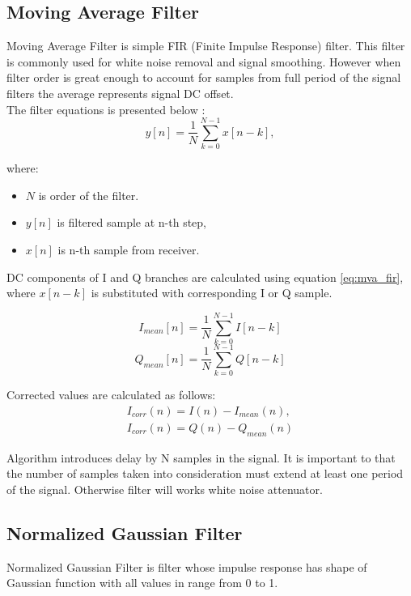 \documentclass[en,printmode]{mgr}
\begin{document}
		\subsection*{Moving Average Filter}
			Moving Average Filter is simple FIR (Finite Impulse Response) filter. This filter is
			commonly used for white noise removal and signal smoothing. However when filter order
			is great enough to account for samples from full period of the signal filters the
			average represents signal DC offset.
			\\
			
			
			The filter equations is presented below \cite{mav}:
			\begin{equation}
				y[n] = \frac{1}{N} \sum_{k=0}^{N-1}x[n-k], \label{eq:mva_fir} 
			\end{equation}
			
			where:
			\begin{itemize}
				\item   $N$ is order of the filter.
				\item	$y[n]$ is filtered sample at n-th step,
				\item   $x[n]$ is n-th sample from receiver.
			\end{itemize}			
			
			DC components of I and Q branches are calculated using equation \ref{eq:mva_fir},
			where $x[n-k]$ is substituted with corresponding I or Q sample.

			\[
				I_{mean}[n] = \frac{1}{N} \sum_{k=0}^{N-1}I[n-k]
			\]
			\[
				Q_{mean}[n] = \frac{1}{N} \sum_{k=0}^{N-1}Q[n-k]
			\]
			
			Corrected values are calculated as follows:
			\[
			\renewcommand*{\arraystretch}{1.3} 
			\begin{array}{ll}
				I_{corr}(n) = I(n) - I_{mean}(n), \\
				I_{corr}(n) = Q(n) - Q_{mean}(n)
			\end{array}
			\]
			
			Algorithm introduces delay by N samples in the signal. It is important to that the number of
			samples taken into consideration must extend at least one period of the signal. Otherwise
			filter will works white noise attenuator.
			
		\subsection*{Normalized Gaussian Filter}
			Normalized Gaussian Filter is filter whose impulse response has shape of Gaussian
			function with all values in range from 0 to 1.
			
\end{document}
